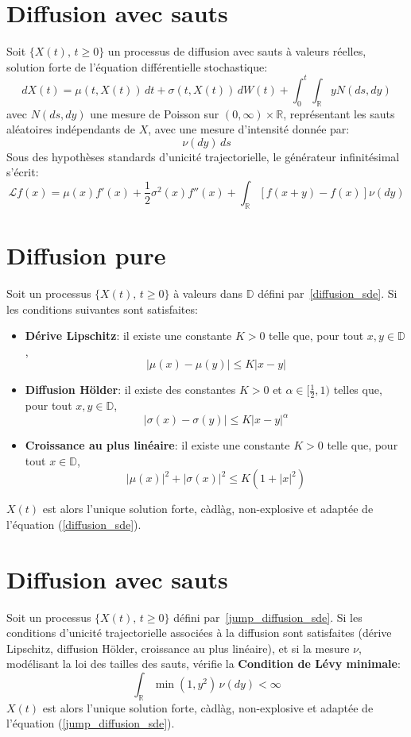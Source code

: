 \section*{Diffusion avec sauts}

Soit \( \{X(t),\, t \geq 0\} \) un processus de diffusion avec sauts à valeurs réelles, solution forte de l'équation différentielle stochastique:
\begin{equation}\label{jump_diffusion_sde}
    dX(t) = \mu(t, X(t))\,dt + \sigma(t, X(t))\,dW(t) + \int_0^t\int_{\mathds{R}} yN(ds,dy)
\end{equation}
avec \( N(ds,dy) \) une mesure de Poisson sur \( (0, \infty) \times \mathds{R} \), représentant les sauts aléatoires indépendants de \( X \), avec une mesure d'intensité donnée par:
\[
\nu(dy)\,ds
\]
Sous des hypothèses standards d'unicité trajectorielle, le générateur infinitésimal s'écrit:
\[
    \mathcal{L}f(x) = \mu(x) f'(x) + \frac{1}{2} \sigma^2(x) f''(x) + \int_{\mathds{R}} \left[f(x+y) - f(x)\right] \nu(dy)
\]

\label{trajecotry_uniqueness}

\section*{Diffusion pure}

Soit un processus \( \{X(t),\, t \geq 0\} \) à valeurs dans \(\mathds{D}\) défini par~\ref{diffusion_sde}.
Si les conditions suivantes sont satisfaites:
\begin{itemize}
    \item \textbf{Dérive Lipschitz}: il existe une constante \( K > 0 \) telle que, pour tout \( x,y \in \mathds{D} \),
    \[
    |\mu(x)-\mu(y)|\leq K|x-y|
    \]
    \item \textbf{Diffusion Hölder}: il existe des constantes \( K > 0 \) et \(\alpha\in[\frac{1}{2},1)\) telles que, pour tout \( x,y \in \mathds{D} \),
    \[
    |\sigma(x)-\sigma(y)|\leq K{|x-y|}^\alpha
    \]
    \item \textbf{Croissance au plus linéaire}: il existe une constante \( K > 0 \) telle que, pour tout \( x \in \mathds{D} \),
    \[
    |\mu(x)|^2 + |\sigma(x)|^2 \leq K(1 + |x|^2)
    \]
\end{itemize}
$X(t)$ est alors l'unique solution forte, càdlàg, non-explosive  et adaptée de l'équation (\ref{diffusion_sde}).

\section*{Diffusion avec sauts}
Soit un processus \( \{X(t),\, t \geq 0\} \) défini par~\ref{jump_diffusion_sde}.
Si les conditions d'unicité trajectorielle associées à la diffusion sont satisfaites (dérive Lipschitz, diffusion Hölder, croissance au plus linéaire), et si la mesure \( \nu \), modélisant la loi des tailles des sauts, vérifie la \textbf{Condition de Lévy minimale}:
\[
\int_{\mathds{R}}\min(1, y^2)\, \nu(dy) < \infty
\]
$X(t)$ est alors l'unique solution forte, càdlàg, non-explosive et adaptée de l'équation (\ref{jump_diffusion_sde}).


